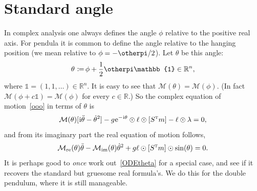 \documentclass[12pt]{article}
\renewcommand{\pi}{\otherpi}
\newcommand{\T}{\textsc{t}}
\newcommand{\cM}{\mathcal{M}}
\newcommand{\mi}{\hspace{.4pt}\mathrm{i}}
\newcommand{\e}{\hspace{.4pt}\mathrm{e}}
\theoremstyle{sfdefinition}%
\theoremstyle{sfdefinition}
\newcommand{\one}{\mathbb{1}}
\newcommand{\mR}{\mathbb{R}}
\newcommand{\ep}{\odot}
\DeclareMathOperator{\coloneq}{\,\raisebox{.08ex}{\ensuremath{:}}\!\!=}
\begin{document}
\section{Standard angle}\label{sec4}
In complex analysis one always defines the angle $\phi$ relative to
the positive real axis. For pendula it is common to define the angle
relative to the hanging position (we mean relative to
$\phi=-\pi/2$). Let $\theta$ be this angle:
\[
  \theta\coloneq \phi+\frac12\pi\one \in\mR^n,
\]
where $\one=(1,1,\ldots)\in\mR^n$. It is easy to see that
$\cM(\theta)=\cM(\phi)$.  (In fact $\cM(\phi+c\one)=\cM(\phi)$ for
every $c\in\mR$.)  So the complex equation of motion~\eqref{ooo} in
terms of $\theta$ is
\[
  \cM(\theta) [\mi\ddot{\theta}-\dot{\theta}^2]
  -g\e^{-\mi\theta}\ep\ell\ep[S^{\T}m]- \ell\ep\lambda = 0,
\]
and from its imaginary part the real equation of motion follows,
\begin{equation}\label{ODEtheta}
  \cM_{\rm re}(\theta)\ddot{\theta}-\cM_{\rm 
    im}(\theta)\dot{\theta}^2+g\ell\ep[S^{\T}m]\ep\sin(\theta)=0. 
\end{equation}
It is perhaps good to \emph{once} work out~\eqref{ODEtheta} for a
special case, and see if it recovers the standard but gruesome real
formula's.  We do this for the double pendulum, where it is still
manageable.
\end{document}
